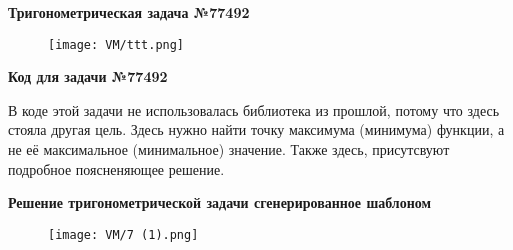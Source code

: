 \textbf{Тригонометрическая задача №77492}

	\begin{figure}[h]
		\centering
		\texttt{[image: VM/ttt.png]}
	\end{figure}


\textbf{Код для задачи №77492}




В коде этой задачи не использовалась библиотека из прошлой, потому что здесь стояла другая цель. Здесь нужно найти точку максимума (минимума) функции, а не её максимальное (минимальное) значение. Также здесь, присутсвуют подробное поясненяющее решение.

\textbf{Решение тригонометрической задачи сгенерированное шаблоном}

	\begin{figure}[h]
		\centering
		\texttt{[image: VM/7 (1).png]}
	\end{figure}
	
\newpage